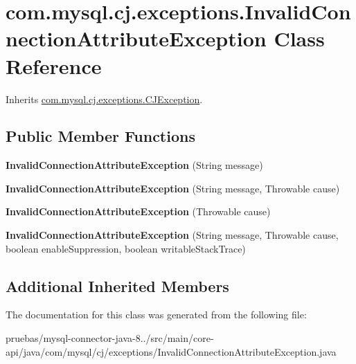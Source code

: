 \hypertarget{classcom_1_1mysql_1_1cj_1_1exceptions_1_1_invalid_connection_attribute_exception}{}\section{com.\+mysql.\+cj.\+exceptions.\+Invalid\+Connection\+Attribute\+Exception Class Reference}
\label{classcom_1_1mysql_1_1cj_1_1exceptions_1_1_invalid_connection_attribute_exception}


Inherits \mbox{\hyperlink{classcom_1_1mysql_1_1cj_1_1exceptions_1_1_c_j_exception}{com.\+mysql.\+cj.\+exceptions.\+C\+J\+Exception}}.

\subsection*{Public Member Functions}
\begin{DoxyCompactItemize}
\item 
\mbox{\label{classcom_1_1mysql_1_1cj_1_1exceptions_1_1_invalid_connection_attribute_exception_aeb0d965c234bd80e7d66f46f9c5b7a33}} 
{\bfseries Invalid\+Connection\+Attribute\+Exception} (String message)
\item 
\mbox{\label{classcom_1_1mysql_1_1cj_1_1exceptions_1_1_invalid_connection_attribute_exception_a3656f26296b5402dc559f2e0bd3bac4d}} 
{\bfseries Invalid\+Connection\+Attribute\+Exception} (String message, Throwable cause)
\item 
\mbox{\label{classcom_1_1mysql_1_1cj_1_1exceptions_1_1_invalid_connection_attribute_exception_ac0691e852584fa7f2b96bac12e6c5ebc}} 
{\bfseries Invalid\+Connection\+Attribute\+Exception} (Throwable cause)
\item 
\mbox{\label{classcom_1_1mysql_1_1cj_1_1exceptions_1_1_invalid_connection_attribute_exception_aa17841838d6c42e697caf8b856a2b18e}} 
{\bfseries Invalid\+Connection\+Attribute\+Exception} (String message, Throwable cause, boolean enable\+Suppression, boolean writable\+Stack\+Trace)
\end{DoxyCompactItemize}
\subsection*{Additional Inherited Members}


The documentation for this class was generated from the following file\+:\begin{DoxyCompactItemize}
\item 
pruebas/mysql-\/connector-\/java-\/8../src/main/core-\/api/java/com/mysql/cj/exceptions/Invalid\+Connection\+Attribute\+Exception.\+java\end{DoxyCompactItemize}

